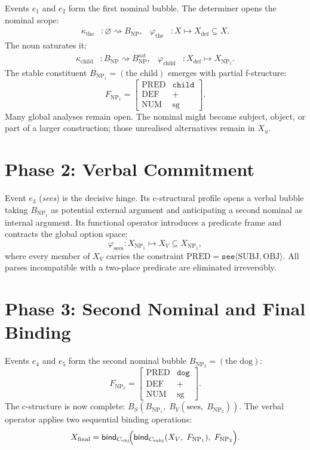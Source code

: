 \documentclass[12pt, oneside]{amsbook}
\theoremstyle{plain}
\theoremstyle{definition}
\theoremstyle{remark}
\newcommand{\bind}{\mathsf{bind}}
\newcommand{\feat}[1]{\left[\begin{array}{ll}#1\end{array}\right]}
\begin{document}
Events $e_1$ and $e_2$ form the first nominal bubble. The determiner opens the
nominal scope:
\begin{align*}
  \kappa_{\text{the}} &: \varnothing \rightsquigarrow B_{\mathrm{NP}},
  &\varphi_{\text{the}} &: X \mapsto X_{\mathrm{def}} \subseteq X.
\end{align*}
The noun saturates it:
\begin{align*}
  \kappa_{\text{child}} &: B_{\mathrm{NP}} \rightsquigarrow
    B_{\mathrm{NP}}^{\mathrm{sat}},
  &\varphi_{\text{child}} &: X_{\mathrm{def}} \mapsto X_{\mathrm{NP}_1}.
\end{align*}
The stable constituent $B_{\mathrm{NP}_1} = (\text{the child})$ emerges with
partial f-structure:
\[
  F_{\mathrm{NP}_1} = \feat{
    \mathrm{PRED} & \texttt{child} \\
    \mathrm{DEF}  & + \\
    \mathrm{NUM}  & \mathrm{sg}
  }.
\]
Many global analyses remain open. The nominal might become subject, object, or
part of a larger construction; those unrealised alternatives remain in $X_u$.

\section{Phase 2: Verbal Commitment}
\label{sec:parse:phase2}

Event $e_3$ (\textit{sees}) is the decisive hinge. Its c-structural profile
opens a verbal bubble taking $B_{\mathrm{NP}_1}$ as potential external argument
and anticipating a second nominal as internal argument. Its functional operator
introduces a predicate frame and contracts the global option space:
\[
  \varphi_{\text{sees}} : X_{\mathrm{NP}_1} \mapsto X_V \subseteq
  X_{\mathrm{NP}_1},
\]
where every member of $X_V$ carries the constraint
$\mathrm{PRED} = \texttt{see}\langle\mathrm{SUBJ},\mathrm{OBJ}\rangle$.
All parses incompatible with a two-place predicate are eliminated irreversibly.

\section{Phase 3: Second Nominal and Final Binding}
\label{sec:parse:phase3}

Events $e_4$ and $e_5$ form the second nominal bubble
$B_{\mathrm{NP}_2} = (\text{the dog})$:
\[
  F_{\mathrm{NP}_2} = \feat{
    \mathrm{PRED} & \texttt{dog} \\
    \mathrm{DEF}  & + \\
    \mathrm{NUM}  & \mathrm{sg}
  }.
\]
The c-structure is now complete:
$B_S(B_{\mathrm{NP}_1},\; B_V(\text{sees},\; B_{\mathrm{NP}_2}))$.
The verbal operator applies two sequential binding operations:
\[
  X_{\mathrm{final}}
  = \bind_{C_{\mathrm{obj}}}\!\Bigl(
      \bind_{C_{\mathrm{subj}}}(X_V,\; F_{\mathrm{NP}_1}),\;
      F_{\mathrm{NP}_2}
    \Bigr).
\]
\end{document}

